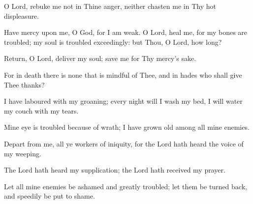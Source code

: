 O Lord, rebuke me not in Thine anger, neither chasten me in Thy hot displeasure.

Have mercy upon me, O God, for I am weak. O Lord, heal me, for my bones are troubled; my soul is troubled exceedingly: but Thou, O Lord, how long?

Return, O Lord, deliver my soul; save me for Thy mercy's sake.

For in death there is none that is mindful of Thee, and in hades who shall give Thee thanks?

I have laboured with my groaning; every night will I wash my bed, I will water my couch with my tears.

Mine eye is troubled because of wrath; I have grown old among all mine enemies.

Depart from me, all ye workers of iniquity, for the Lord hath heard the voice of my weeping.

The Lord hath heard my supplication; the Lord hath received my prayer.

Let all mine enemies be ashamed and greatly troubled; let them be turned back, and speedily be put to shame.
